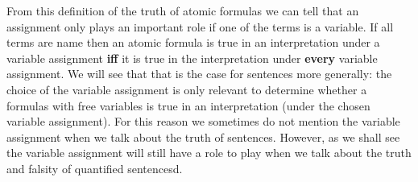 From this definition of the truth of atomic formulas we can tell that an assignment only plays an important role if one of the terms is a variable. If all terms are name then an atomic formula is true in an interpretation under a variable assignment \textbf{iff} it is true in the interpretation under \textbf{every} variable assignment. We will see that that is the case for sentences more generally: the choice of the variable assignment is only relevant to determine whether a formulas with free variables is true in an interpretation (under the chosen variable assignment). For this reason we sometimes do not mention the variable assignment when we talk about the truth of sentences. However, as we shall see the variable assignment will still have a role to play when we talk about the truth and falsity of quantified sentencesd.

